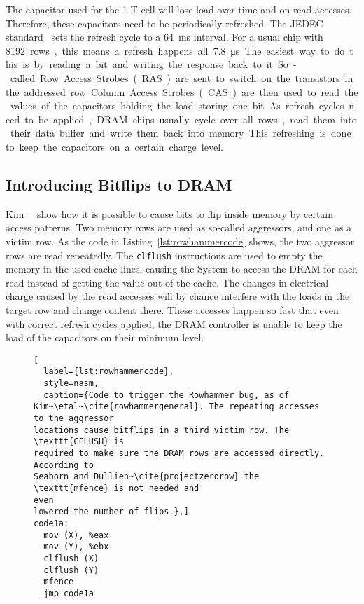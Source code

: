 The capacitor used for the 1-T cell will lose load over time and on read
accesses. Therefore, these capacitors need to be periodically refreshed. The
JEDEC standard~\cite{jedec} sets the refresh cycle to a \SI{64}{\milli\second}
interval. For a usual chip with \SI{8192} rows, this means a refresh happens all
\SI{7.8}{\micro\second}. The easiest way to do this is by reading a bit and
writing the response back to it. So-called Row Access Strobes (RAS) are sent to
switch on the transistors in the addressed row. Column Access Strobes (CAS) are
then used to read the values of the capacitors holding the load storing one bit.
As refresh cycles need to be applied, DRAM chips usually cycle over all rows,
read them into their data buffer and write them back into memory. This
refreshing is done to keep the capacitors on a certain charge level.

\subsection{Introducing Bitflips to DRAM}

Kim~\etal~\cite{rowhammergeneral} show how it is possible to cause bits to flip
inside memory by certain access patterns. Two memory rows are used as so-called
aggressors, and one as a victim row. As the code in
Listing~\ref{lst:rowhammercode} shows, the two aggressor rows are read
repeatedly.  The \texttt{clflush} instructions are used to empty the memory in
the used cache lines, causing the System to access the DRAM for each read
instead of getting the value out of the cache. The changes in electrical charge
caused by the read accesses will by chance interfere with the loads in the
target row and change content there. These accesses happen so fast that even
with correct refresh cycles applied, the DRAM controller is unable to keep the
load of the capacitors on their minimum level.

\begin{figure}
\begin{minipage}{\linewidth}
\begin{lstlisting}[
  label={lst:rowhammercode},
  style=nasm,
  caption={Code to trigger the Rowhammer bug, as of
Kim~\etal~\cite{rowhammergeneral}. The repeating accesses to the aggressor
locations cause bitflips in a third victim row. The \texttt{CFLUSH} is
required to make sure the DRAM rows are accessed directly. According to
Seaborn and Dullien~\cite{projectzerorow} the \texttt{mfence} is not needed and
even
lowered the number of flips.},]
code1a:
  mov (X), %eax
  mov (Y), %ebx
  clflush (X)
  clflush (Y)
  mfence
  jmp code1a
\end{lstlisting}
\end{minipage}
\end{figure}

